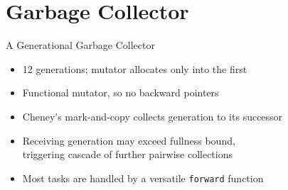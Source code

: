\documentclass[professionalfonts, xcolor=table]{beamer}
\begin{document}
\section{Garbage Collector}

\begin{frame}{A Generational Garbage Collector}
  \begin{itemize}
  \item 12 generations; mutator allocates only into the first
  \item Functional mutator, so no backward pointers
  \pause
  \item Cheney's mark-and-copy collects generation to its successor
  \item Receiving generation may exceed fullness bound, \\
  triggering cascade of further pairwise collections
  \pause
  \item Most tasks are handled by a versatile \texttt{forward} function
  \end{itemize}
\end{frame}

\usetikzlibrary{positioning}
\end{document}

